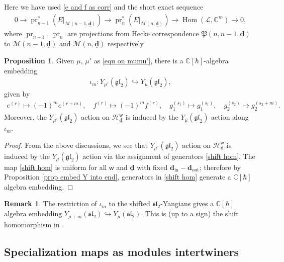 \documentclass[10pt]{amsart}
\theoremstyle{definition}
\newtheorem{Proposition}[Theorem]{Proposition}
\newtheorem{Remark}[Theorem]{Remark}
\numberwithin{equation}{section}
\newcommand{\bC}{\mathbb{C}}
\newcommand{\bd}{\mathbf{d}}
\newcommand{\cH}{\mathcal{H}}
\newcommand{\cL}{\mathcal{L}}
\newcommand{\cM}{\mathcal{M}}
\newcommand{\sw}{\mathsf{w}}
\newcommand{\Hom}{\operatorname{Hom}}
\newcommand{\pr}{\operatorname{pr}}
\newcommand{\In}{\operatorname{in}}
\newcommand{\Out}{\operatorname{out}}
\begin{document}
Here we have used \eqref{e and f as corr} and the short exact sequence
\begin{align*}
    0\longrightarrow \pr_{n-1}^*(E|_{\cM(n-1,\underline{\bd})})\longrightarrow \pr_{n}^*(E|_{\cM(n,\underline{\bd})})\longrightarrow \Hom(\cL,\bC^m)\longrightarrow 0,
\end{align*}
where $\pr_{n-1}$, $\pr_n$ are projections from Hecke correspondence $\mathfrak{P}(n,n-1,\underline{\bd})$ to $\cM(n-1,\underline{\bd})$ and $\cM(n,\underline{\bd})$ respectively.

\begin{Proposition}
Given $\mu$, $\mu'$ as \eqref{equ on mumu'}, there is a $\bC[\hbar]$-algebra embedding 
\begin{align*}
    \iota_m\colon Y_{\mu'}(\mathfrak{gl}_2)\hookrightarrow Y_{\mu}(\mathfrak{gl}_2),
\end{align*}
given by 
\begin{align}\label{shift hom}
    e^{(r)}\mapsto (-1)^m e^{(r+m)},\quad f^{(r)}\mapsto (-1)^m f^{(r)},\quad g_1^{(s_1)}\mapsto g_1^{(s_1)},\quad g_2^{(s_2)}\mapsto g_2^{(s_2+m)}.
\end{align}
Moreover, the $Y_{\mu'}(\mathfrak{gl}_2)$ action on $\cH^\sw_{\underline{\bd}}$ is induced by the $Y_{\mu}(\mathfrak{gl}_2)$ action along $\iota_m$.
\end{Proposition}

\begin{proof}
From the above discussions, we see that $Y_{\mu'}(\mathfrak{gl}_2)$ action on $\cH^\sw_{\underline{\bd}}$ is induced by the $Y_{\mu}(\mathfrak{gl}_2)$ action via the assignment of generators \eqref{shift hom}. The map \eqref{shift hom} is uniform for all $\sw$ and $\underline{\bd}$ with fixed $\bd_{\In}-\bd_{\Out}$; therefore by Proposition \ref{prop embed Y into end}, generators in \eqref{shift hom} generate a $\bC[\hbar]$ algebra embedding.
\end{proof}




\begin{Remark}
The restriction of $\iota_m$ to the shifted $\mathfrak{sl}_2$-Yangians gives a $\bC[\hbar]$ algebra embedding $Y_{\mu+m}(\mathfrak{sl}_2)\hookrightarrow Y_{\mu}(\mathfrak{sl}_2)$. This is (up to a sign) the shift homomorphism in \cite[Prop.~3.8]{FKPRW}.
\end{Remark}


\fi


\subsection{Specialization maps as modules intertwiners}
\end{document}
